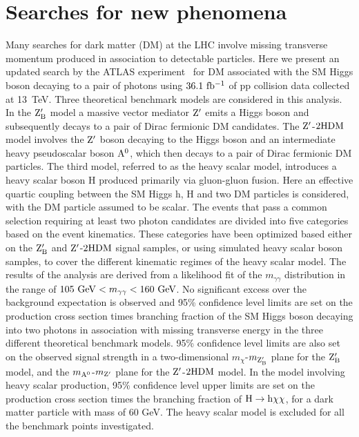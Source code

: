 \documentclass[10pt]{article}
\begin{document}
\section{Searches for new phenomena}

Many searches for dark matter (DM) at the LHC involve missing transverse momentum
produced in association to detectable particles. Here we present an updated search
by the ATLAS experiment~\cite{ATLAS-twophoton-BSM} for DM associated with the SM
Higgs boson decaying to a pair of photons using $36.1~{\rm fb^{-1}}$ of pp
collision data collected at 13~TeV. Three theoretical benchmark models are
considered in this analysis. In the ${\rm Z_{B}'}$ model a massive vector
mediator ${\rm Z'}$ emits a Higgs boson and subsequently decays to a pair of Dirac
fermionic DM candidates.
The ${\rm Z'}$-${\rm 2HDM}$ model involves the ${\rm Z'}$ boson decaying
to the Higgs boson and an intermediate heavy pseudoscalar boson ${\rm A^{0}}$,
which then decays to a pair of Dirac fermionic DM particles. The third model,
referred to as the heavy scalar model, introduces a heavy scalar boson H
produced primarily via gluon-gluon fusion. Here an effective quartic coupling
between the SM Higgs h, H and two DM particles is considered, with the DM
particle assumed to be scalar. The events that pass a common selection requiring
at least two photon candidates are divided into five categories based on the
event kinematics. These categories have been optimized based either on the ${\rm Z_{B}'}$
and ${\rm Z'}$-${\rm 2HDM}$ signal samples, or using simulated heavy scalar
boson samples, to cover the different kinematic regimes of the heavy scalar
model. The results of the analysis are derived from a likelihood fit of the
$m_{\gamma\gamma}$ distribution in the range of
$105~{\rm GeV} < m_{\gamma\gamma} < 160~{\rm GeV}$.
No significant excess over
the background expectation is observed and 95\% confidence level limits are set
on the production cross section times branching fraction of the SM Higgs boson
decaying into two photons in association with missing transverse energy in the
three different theoretical benchmark models. 95\% confidence level limits are
also set on the observed signal strength in a two-dimensional
$m_{\chi}$-$m_{\rm Z_{B}'}$ plane for the ${\rm Z_{B}'}$ model, and the
$m_{\rm A^0}$-$m_{\rm Z'}$ plane for the ${\rm Z'}$-${\rm 2HDM}$ model. In the
model involving heavy scalar production, 95\% confidence level upper limits are
set on the production cross section times the branching fraction of
${\rm H}\to{\rm h}\chi\chi$, for a dark matter
particle with mass of 60 GeV. The heavy scalar model is excluded for all the
benchmark points investigated.
\end{document}

